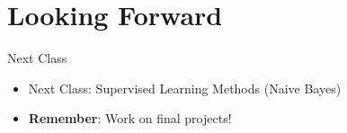 \documentclass[
  ignorenonframetext,
  aspectratio=169]{beamer}
\begin{document}
\section{Looking Forward}\label{looking-forward}

\begin{frame}{Next Class}
\label{next-class}
\begin{itemize}
\item Next Class: Supervised Learning Methods (Naive Bayes)
\item \textbf{Remember}: Work on final projects! 
\end{itemize}
\end{frame}
\end{document}
